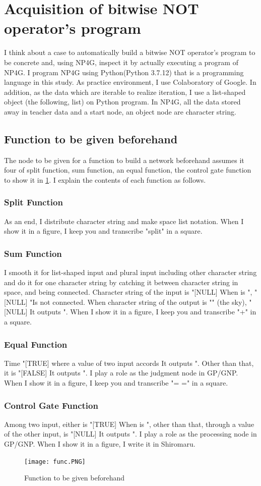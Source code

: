 \documentclass{article}
\begin{document}
\section {Acquisition of bitwise NOT operator's program}
I think about a case to automatically build a bitwise NOT operator's program to be concrete and, using NP4G, inspect it by actually executing a program of NP4G.
I program NP4G using Python(Python 3.7.12) that is a programming language in this study.
As practice environment, I use Colaboratory of Google.
In addition, as the data which are iterable to realize iteration, I use a list-shaped object (the following, list) on Python program.
In NP4G, all the data stored away in teacher data and a start node, an object node are character string.
\subsection {Function to be given beforehand}
The node to be given for a function to build a network beforehand assumes it four of split function, sum function, an equal function, the control gate function to show it in \ref{fig:func}.
I explain the contents of each function as follows.
\subsubsection{Split Function}
As an end, I distribute character string and make space list notation.
When I show it in a figure, I keep you and transcribe "split" in a square.
\subsubsection{Sum Function}
I smooth it for list-shaped input and plural input including other character string and do it for one character string by catching it between character string in space, and being connected.
Character string of the input is "[NULL]
When is ", "[NULL]
"Is not connected.
When character string of the output is "" (the sky), "[NULL]
It outputs ".
When I show it in a figure, I keep you and transcribe "+" in a square.
\subsubsection {Equal Function}
Time "[TRUE] where a value of two input accords
It outputs ".
Other than that, it is "[FALSE]
It outputs ".
I play a role as the judgment node in GP/GNP.
When I show it in a figure, I keep you and transcribe "= =" in a square.
\subsubsection {Control Gate Function}
Among two input, either is "[TRUE]
When is ", other than that, through a value of the other input, is "[NULL]
It outputs ".
I play a role as the processing node in GP/GNP.
When I show it in a figure, I write it in Shiromaru.
\begin{figure}[t]
\begin{center}
\texttt{[image: func.PNG]}
\end{center}
\caption {Function to be given beforehand}
\label{fig:func}
\end{figure}
\end{document}
